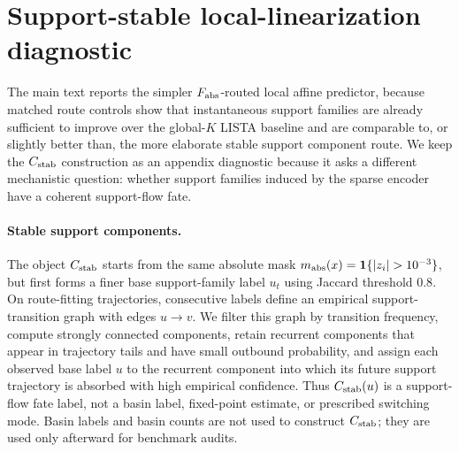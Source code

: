 \section{Support-stable local-linearization diagnostic}
\label{sec:cstab_local_linearizations}

The main text reports the simpler \(F_{\rm abs}\)-routed local affine predictor, because matched route controls show that instantaneous support families are already sufficient to improve over the global-\(K\) LISTA baseline and are comparable to, or slightly better than, the more elaborate stable support component route. We keep the \(C_{\rm stab}\) construction as an appendix diagnostic because it asks a different mechanistic question: whether support families induced by the sparse encoder have a coherent support-flow fate.

\paragraph{Stable support components.}
The object \(C_{\rm stab}\) starts from the same absolute mask \(m_{\rm abs}(x)=\mathbf{1}\{|z_i|>10^{-3}\}\), but first forms a finer base support-family label \(u_t\) using Jaccard threshold \(0.8\). On route-fitting trajectories, consecutive labels define an empirical support-transition graph with edges \(u\to v\). We filter this graph by transition frequency, compute strongly connected components, retain recurrent components that appear in trajectory tails and have small outbound probability, and assign each observed base label \(u\) to the recurrent component into which its future support trajectory is absorbed with high empirical confidence. Thus \(C_{\rm stab}(u)\) is a support-flow fate label, not a basin label, fixed-point estimate, or prescribed switching mode. Basin labels and basin counts are not used to construct \(C_{\rm stab}\); they are used only afterward for benchmark audits.

